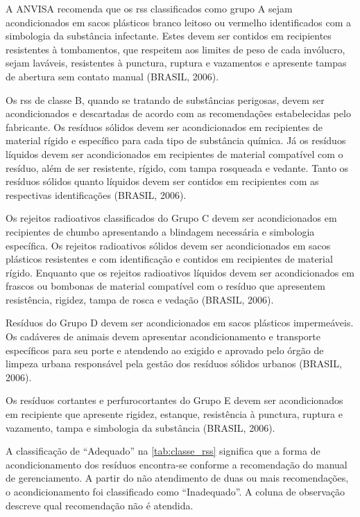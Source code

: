 	A ANVISA recomenda que os \gls{rss} classificados como grupo A sejam acondicionados em sacos plásticos branco leitoso ou vermelho identificados com a simbologia da substância infectante. Estes devem ser contidos em recipientes resistentes à tombamentos, que respeitem aos limites de peso de cada invólucro, sejam laváveis, resistentes à punctura, ruptura e vazamentos e apresente tampas de abertura sem contato manual (BRASIL, 2006).
	
	Os \gls{rss} de classe B, quando se tratando de substâncias perigosas, devem ser acondicionados e descartadas de acordo com as recomendações estabelecidas pelo fabricante. Os resíduos sólidos devem ser acondicionados em recipientes de material rígido e específico para cada tipo de substância química. Já os resíduos líquidos devem ser acondicionados em recipientes de material compatível com o resíduo, além de ser resistente, rígido, com tampa rosqueada e vedante. Tanto os resíduos sólidos quanto líquidos devem ser contidos em recipientes com as respectivas identificações (BRASIL, 2006).
	
	Os rejeitos radioativos classificados do Grupo C devem ser acondicionados em recipientes de chumbo apresentando a blindagem necessária e simbologia específica. Os rejeitos radioativos sólidos devem ser acondicionados em sacos plásticos resistentes e com identificação e contidos em recipientes de material rígido. Enquanto que os rejeitos radioativos líquidos devem ser acondicionados em frascos ou bombonas de material compatível com o resíduo que apresentem resistência, rigidez, tampa de rosca e vedação (BRASIL, 2006).
	
	Resíduos do Grupo D devem ser acondicionados em sacos plásticos impermeáveis. Os cadáveres de animais devem apresentar acondicionamento e transporte específicos para seu porte e atendendo ao exigido e aprovado pelo órgão de limpeza urbana responsável pela gestão dos resíduos sólidos urbanos (BRASIL, 2006).
	
	Os resíduos cortantes e perfurocortantes do Grupo E devem ser acondicionados em recipiente que apresente rigidez, estanque, resistência à punctura, ruptura e vazamento, tampa e simbologia da substância (BRASIL, 2006).
	
	A classificação de “Adequado” na \autoref{tab:classe_rss} significa que a forma de acondicionamento dos resíduos encontra-se conforme a recomendação do manual de gerenciamento. A partir do não atendimento de duas ou mais recomendações, o acondicionamento foi classificado como “Inadequado”. A coluna de observação descreve qual recomendação não é atendida.
	
